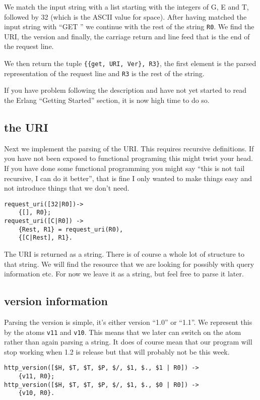 \documentclass[a4paper, 11pt]{article}
\begin{document}
We match the input string with a list starting with the integers of G, E and T,
followed by 32 (which is the ASCII value for space). After having
matched the input string with ``GET '' we continue with the rest of
the string {\tt R0}. We find the URI, the version and finally, the
carriage return and line feed that is the end of the request line. 

We then return the tuple {\tt \{\{get, URI, Ver\}, R3\}}, the first
element is the parsed representation of the request line and {\tt R3}
is the rest of the string.

If you have problem following the description and have not yet started
to read the Erlang ``Getting Started'' section, it is now high time to
do so. 

\subsection{the URI}

Next we implement the parsing of the URI. This requires recursive
definitions. If you have not been exposed to functional
programing this might twist your head. If you have done some functional
programming you might say ``this is not tail recursive, I can do it
better'', that is fine I only wanted to make things easy and not
introduce things that we don't need. 

\begin{verbatim}
request_uri([32|R0])->
    {[], R0};
request_uri([C|R0]) ->
    {Rest, R1} = request_uri(R0),
    {[C|Rest], R1}.
\end{verbatim}

The URI is returned as a string. There is of course a whole lot of
structure to that string. We will find the resource that we are
looking for possibly with query information etc. For now we leave it
as a string, but feel free to parse it later.

\subsection{version information}

Parsing the version is simple, it's either version ``1.0'' or
``1.1''. We represent this by the atoms {\tt v11} and {\tt v10}. This
means that we later can switch on the atom rather than again parsing a
string. It does of course mean that our program will stop working when
1.2 is release but that will probably not be this week.

\begin{verbatim}
http_version([$H, $T, $T, $P, $/, $1, $., $1 | R0]) ->
    {v11, R0};
http_version([$H, $T, $T, $P, $/, $1, $., $0 | R0]) ->
    {v10, R0}.
\end{verbatim}
\end{document}
